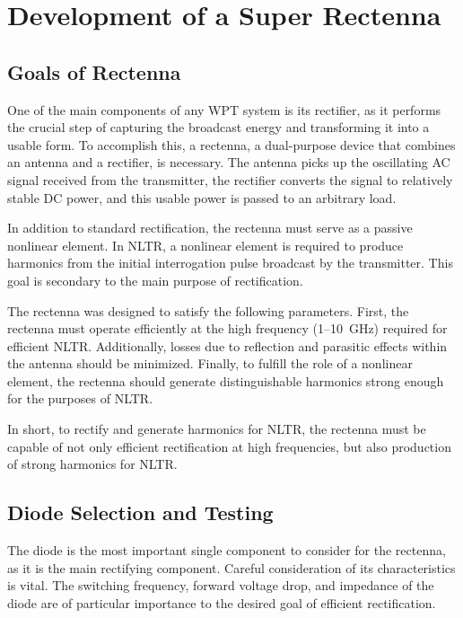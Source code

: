 \chapter{Development of a Super Rectenna}
\label{ch:rectenna}
\section{Goals of Rectenna}
\label{sec:rectenna-goals}

One of the main components of any WPT system is its rectifier, as it performs the crucial step of capturing the broadcast energy and transforming it into a usable form. To accomplish this, a rectenna, a dual-purpose device that combines an antenna and a rectifier, is necessary. The antenna picks up the oscillating AC signal received from the transmitter, the rectifier converts the signal to relatively stable DC power, and this usable power is passed to an arbitrary load.

In addition to standard rectification, the rectenna must serve as a passive nonlinear element. In NLTR, a nonlinear element is required to produce harmonics from the initial interrogation pulse broadcast by the transmitter. This goal is secondary to the main purpose of rectification.

The rectenna was designed to satisfy the following parameters. First, the rectenna must operate efficiently at the high frequency (\numrange{1}{10}~GHz) required for efficient NLTR. Additionally, losses due to reflection and parasitic effects within the antenna should be minimized. Finally, to fulfill the role of a nonlinear element, the rectenna should generate distinguishable harmonics strong enough for the purposes of NLTR.

In short, to rectify and generate harmonics for NLTR, the rectenna must be capable of not only efficient rectification at high frequencies, but also production of strong harmonics for NLTR.

\section{Diode Selection and Testing}
\label{sec:rectenna-diode}

The diode is the most important single component to consider for the rectenna, as it is the main rectifying component. Careful consideration of its characteristics is vital. The switching frequency, forward voltage drop, and impedance of the diode are of particular importance to the desired goal of efficient rectification.

